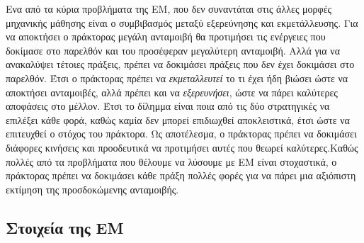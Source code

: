 Ενα από τα κύρια προβλήματα της ΕΜ, που δεν συναντάται στις άλλες μορφές μηχανικής μάθησης είναι
ο συμβιβασμός μεταξύ εξερεύνησης και εκμετάλλευσης. Για να αποκτήσει ο πράκτορας μεγάλη ανταμοιβή
θα προτιμήσει τις ενέργειες που δοκίμασε στο παρελθόν και του προσέφεραν μεγαλύτερη ανταμοιβή. Αλλά
για να ανακαλύψει τέτοιες πράξεις, πρέπει να δοκιμάσει πράξεις που δεν έχει δοκιμάσει στο παρελθόν.
Έτσι ο πράκτορας πρέπει να \textit{εκμεταλλευτεί} το τι έχει ήδη βιώσει ώστε να αποκτήσει ανταμοιβές,
αλλά πρέπει και να \textit{εξερευνήσει}, ώστε να πάρει καλύτερες αποφάσεις στο μέλλον. Έτσι το δίλημμα
είναι ποια από τις δύο στρατηγικές να επιλέξει κάθε φορά, καθώς καμία δεν μπορεί επιδιωχθεί αποκλειστικά,
έτσι ώστε να επιτευχθεί ο στόχος του πράκτορα. Ως αποτέλεσμα, ο πράκτορας πρέπει να δοκιμάσει διάφορες
κινήσεις και προοδευτικά να προτιμήσει αυτές που θεωρεί καλύτερες.Καθώς πολλές από τα προβλήματα που
θέλουμε να λύσουμε με ΕΜ είναι στοχαστικά, ο πράκτορας πρέπει να δοκιμάσει κάθε πράξη πολλές φορές
για να πάρει μια αξιόπιστη εκτίμηση της προσδοκώμενης ανταμοιβής.


\subsection{Στοιχεία της ΕΜ}

